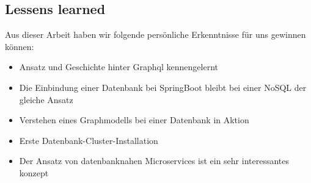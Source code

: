 
\subsection{Lessens learned}
Aus dieser Arbeit haben wir folgende persönliche Erkenntnisse für uns gewinnen können:
\begin{itemize}
\item Ansatz und Geschichte hinter Graphql kennengelernt
\item Die Einbindung einer Datenbank bei SpringBoot bleibt bei einer \ac{NoSQL} der gleiche Ansatz
\item Verstehen eines Graphmodells bei einer Datenbank in Aktion
\item Erste Datenbank-Cluster-Installation
\item Der Ansatz von datenbanknahen Microservices ist ein sehr interessantes konzept
\end{itemize}